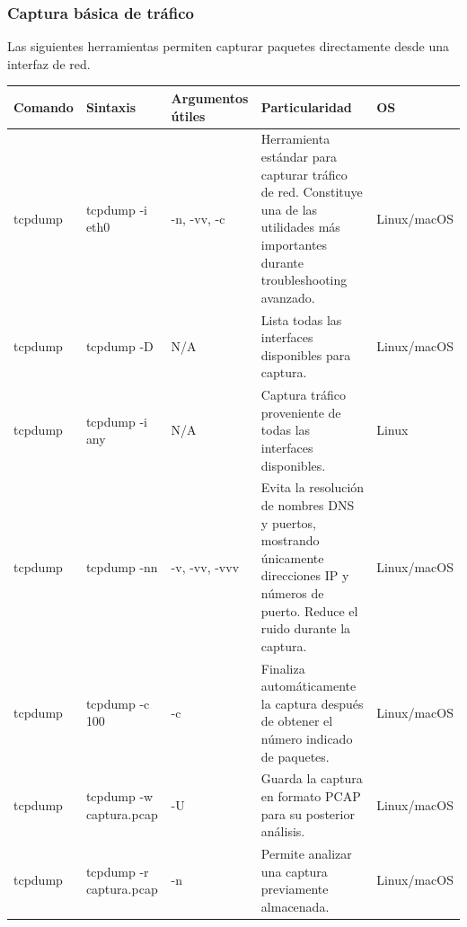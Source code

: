 \documentclass[a4paper,10pt]{article}
\begin{document}

\subsubsection{Captura básica de tráfico}

Las siguientes herramientas permiten capturar paquetes directamente desde una
interfaz de red.

\begin{longtable}{|p{2.8cm}|p{3cm}|p{4cm}|p{5.6cm}|p{1.5cm}|}

\hline
Comando &
Sintaxis &
Argumentos útiles &
Particularidad &
OS
\\
\hline
\endhead

tcpdump &
tcpdump -i eth0 &
-n, -vv, -c &
Herramienta estándar para capturar tráfico de red. Constituye una de las utilidades más importantes durante troubleshooting avanzado. &
Linux/macOS
\\
\hline

tcpdump &
tcpdump -D &
N/A &
Lista todas las interfaces disponibles para captura. &
Linux/macOS
\\
\hline

tcpdump &
tcpdump -i any &
N/A &
Captura tráfico proveniente de todas las interfaces disponibles. &
Linux
\\
\hline

tcpdump &
tcpdump -nn &
-v, -vv, -vvv &
Evita la resolución de nombres DNS y puertos, mostrando únicamente direcciones IP y números de puerto. Reduce el ruido durante la captura. &
Linux/macOS
\\
\hline

tcpdump &
tcpdump -c 100 &
-c &
Finaliza automáticamente la captura después de obtener el número indicado de paquetes. &
Linux/macOS
\\
\hline

tcpdump &
tcpdump -w captura.pcap &
-U &
Guarda la captura en formato PCAP para su posterior análisis. &
Linux/macOS
\\
\hline

tcpdump &
tcpdump -r captura.pcap &
-n &
Permite analizar una captura previamente almacenada. &
Linux/macOS
\\
\hline

\end{longtable}

\end{document}
